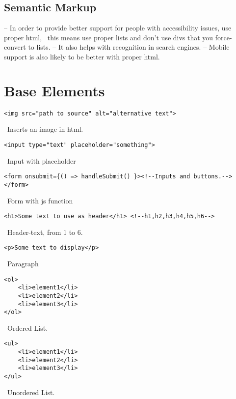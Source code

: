 \documentclass[main.tex,fontsize=6pt,paper=a4,paper=landscape,DIV=calc,]{scrartcl}
\begin{document}
\begin{multicols*}{4}
\subsection{Semantic Markup}
-- In order to provide better support for people with accessibility issues, use proper html,\newline \,\,\, this means use proper lists and don't use divs that you force-convert to lists.\newline
-- It also helps with recognition in search engines.\newline
-- Mobile support is also likely to be better with proper html.



\section{Base Elements}
\begin{lstlisting}
<img src="path to source" alt="alternative text">
\end{lstlisting}
\, \newline
 Inserts an image in html.
\begin{lstlisting}
<input type="text" placeholder="something">
\end{lstlisting}
\, \newline
 Input with placeholder
\begin{lstlisting}
<form onsubmit={() => handleSubmit() }><!--Inputs and buttons.--> </form>
\end{lstlisting}
\, \newline
 Form with js function
\begin{lstlisting}
<h1>Some text to use as header</h1> <!--h1,h2,h3,h4,h5,h6-->
\end{lstlisting}
\, \newline
 Header-text, from 1 to 6.

\begin{lstlisting}
<p>Some text to display</p>
\end{lstlisting}
\, \newline
 Paragraph

\begin{lstlisting}
<ol>
    <li>element1</li>
    <li>element2</li>
    <li>element3</li>
</ol>
\end{lstlisting}
\, \newline
 Ordered List.

\begin{lstlisting}
<ul>
    <li>element1</li>
    <li>element2</li>
    <li>element3</li>
</ul>
\end{lstlisting}
\, \newline
 Unordered List.


\end{multicols*}
\end{document}
